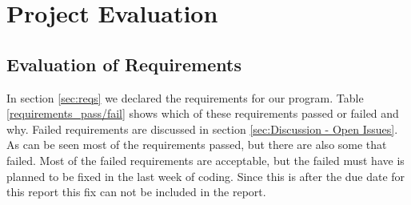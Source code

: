 \chapter{Project Evaluation}


\section{Evaluation of Requirements}
In section \ref{sec:reqs} we declared the requirements for our program. Table \ref{requirements_pass/fail} shows which of these requirements passed or failed and why. Failed requirements are discussed in section \ref{sec:Discussion - Open Issues}. As can be seen most of the requirements passed, but there are also some that failed. Most of the failed requirements are acceptable, but the failed must have is planned to be fixed in the last week of coding. Since this is after the due date for this report this fix can not be included in the report.\\

